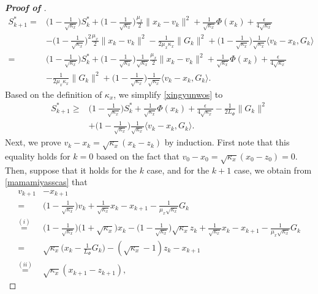 \documentclass{osudissert96}
\begin{document}
\begin{proof}[{\bf Proof of }]
\begin{align}
 S_{k+1}^*  =&  \Big(1-\frac{1}{\sqrt{\kappa_x}} \Big) S_{k}^*  +  \Big(1-\frac{1}{\sqrt{\kappa_x}} \Big)  \frac{\mu_x}{2}\|x_k-v_k\|^2 + \frac{1}{\sqrt{\kappa_x}}\Phi(x_k) + \frac{\epsilon}{4\sqrt{\kappa_x}} \nonumber
 \\&- \Big(1-\frac{1}{\sqrt{\kappa_x}} \Big)^2\frac{\mu_x}{2}\|x_k-v_k\|^2 - \frac{1}{2\mu_x\kappa_x}\|G_k\|^2 +  \Big(1-\frac{1}{\sqrt{\kappa_x}} \Big)\frac{1}{\sqrt{\kappa_x}}\langle v_k-x_k,G_k \rangle \nonumber
 \\ = & \Big(1-\frac{1}{\sqrt{\kappa_x}} \Big) S_{k}^*  + \Big(1-\frac{1}{\sqrt{\kappa_x}} \Big) \frac{1}{\sqrt{\kappa_x}} \frac{\mu_x}{2}\|x_k-v_k\|^2 +\frac{1}{\sqrt{\kappa_x}}\Phi(x_k) + \frac{\epsilon}{4\sqrt{\kappa_x}}\nonumber
 \\&- \frac{1}{2\mu_x\kappa_x}\|G_k\|^2 +  \Big(1-\frac{1}{\sqrt{\kappa_x}} \Big)\frac{1}{\sqrt{\kappa_x}}\langle v_k-x_k,G_k \rangle.
 \end{align}  
 Based on the definition of $\kappa_x$, we simplify \cref{xingyunwos} to 
 \begin{align}\label{yifenyimiaos}
  S_{k+1}^* \geq & \Big(1-\frac{1}{\sqrt{\kappa_x}} \Big) S_{k}^* +\frac{1}{\sqrt{\kappa_x}}\Phi(x_k) + \frac{\epsilon}{4\sqrt{\kappa_x}}- \frac{1}{2L_\Phi}\|G_k\|^2  \nonumber
  \\&+  \Big(1-\frac{1}{\sqrt{\kappa_x}} \Big)\frac{1}{\sqrt{\kappa_x}}\langle v_k-x_k,G_k \rangle.
 \end{align}
 Next, we prove $v_k-x_k = \sqrt{\kappa_x}(x_k-z_k)$ by induction. First note that this equality holds for $k=0$ based on the fact that $v_0-x_0=\sqrt{\kappa_x}(x_0-z_0)=0$. Then, suppose that it holds for the $k$ case, and for the $k+1$ case, we obtain from \cref{mamamiyasscas} that 
 \begin{align*}
  v_{k+1}& -x_{k+1}
  \\= &\Big(1-\frac{1}{\sqrt{\kappa_x}} \Big)v_k + \frac{1}{\sqrt{\kappa_x}} x_k-x_{k+1} - \frac{1}{\mu_x\sqrt{\kappa_x}} G_k \nonumber
  \\ \overset{(i)}=& \Big(1-\frac{1}{\sqrt{\kappa_x}} \Big)\Big(1+\sqrt{\kappa_x} \Big) x_k -\Big(1-\frac{1}{\sqrt{\kappa_x}} \Big)\sqrt{\kappa_x}z_k +\frac{1}{\sqrt{\kappa_x}} x_k -x_{k+1} -\frac{1}{\mu_x\sqrt{\kappa_x}} G_k \nonumber
  \\=& \sqrt{\kappa_x} \Big(x_k-\frac{1}{L_\Phi}G_k\Big) -(\sqrt{\kappa_x}-1) z_k -x_{k+1} \nonumber
  \\\overset{(ii)}=&\sqrt{\kappa_x} (x_{k+1}-z_{k+1}),

\end{align*}
\end{proof}
\end{document}
